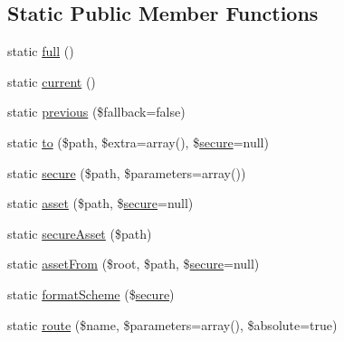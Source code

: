 \subsection*{Static Public Member Functions}
\begin{DoxyCompactItemize}
\item 
static \mbox{\hyperlink{class_illuminate_1_1_support_1_1_facades_1_1_u_r_l_ac76270a649ce060327425739158803d5}{full}} ()
\item 
static \mbox{\hyperlink{class_illuminate_1_1_support_1_1_facades_1_1_u_r_l_ae6777e06c74d9fab903a4784e944af35}{current}} ()
\item 
static \mbox{\hyperlink{class_illuminate_1_1_support_1_1_facades_1_1_u_r_l_aa702c8032493dc9dd9b41ff7836aca40}{previous}} (\$fallback=false)
\item 
static \mbox{\hyperlink{class_illuminate_1_1_support_1_1_facades_1_1_u_r_l_ae2859402af7949f436e3c7c16e433328}{to}} (\$path, \$extra=array(), \$\mbox{\hyperlink{class_illuminate_1_1_support_1_1_facades_1_1_u_r_l_a8ea376b68f8fe32c1e6bd61873811adb}{secure}}=null)
\item 
static \mbox{\hyperlink{class_illuminate_1_1_support_1_1_facades_1_1_u_r_l_a8ea376b68f8fe32c1e6bd61873811adb}{secure}} (\$path, \$parameters=array())
\item 
static \mbox{\hyperlink{class_illuminate_1_1_support_1_1_facades_1_1_u_r_l_ab82dbfffc70ca9168feee331e5e02154}{asset}} (\$path, \$\mbox{\hyperlink{class_illuminate_1_1_support_1_1_facades_1_1_u_r_l_a8ea376b68f8fe32c1e6bd61873811adb}{secure}}=null)
\item 
static \mbox{\hyperlink{class_illuminate_1_1_support_1_1_facades_1_1_u_r_l_a52dd5665dd062ae019c11b2c137be337}{secure\+Asset}} (\$path)
\item 
static \mbox{\hyperlink{class_illuminate_1_1_support_1_1_facades_1_1_u_r_l_a465546e639d4bfb3316736ae9bc4aca3}{asset\+From}} (\$root, \$path, \$\mbox{\hyperlink{class_illuminate_1_1_support_1_1_facades_1_1_u_r_l_a8ea376b68f8fe32c1e6bd61873811adb}{secure}}=null)
\item 
static \mbox{\hyperlink{class_illuminate_1_1_support_1_1_facades_1_1_u_r_l_aa870dc8e0895e10d816696313b4202c6}{format\+Scheme}} (\$\mbox{\hyperlink{class_illuminate_1_1_support_1_1_facades_1_1_u_r_l_a8ea376b68f8fe32c1e6bd61873811adb}{secure}})
\item 
static \mbox{\hyperlink{class_illuminate_1_1_support_1_1_facades_1_1_u_r_l_a993fae36ed2677c36bc9e4b72aa31184}{route}} (\$name, \$parameters=array(), \$absolute=true)
\item 

\end{DoxyCompactItemize}
